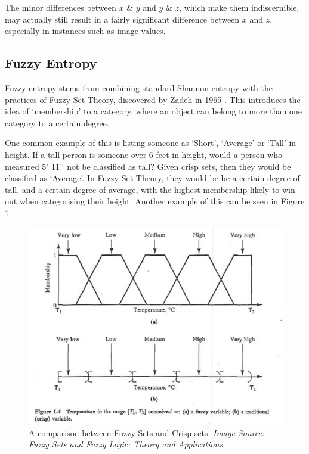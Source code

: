 The minor differences between $x$ \& $y$ and $y$ \& $z$, which make them indiscernible, may actually still result in a fairly significant difference between $x$ and $z$, especially in instances such as image values.

\subsection{Fuzzy Entropy}
\label{ssec:fuzzy-entropy}

Fuzzy entropy stems from combining standard Shannon entropy with the practices of Fuzzy Set Theory, discovered by Zadeh in 1965 \cite{Zadeh_1965}. This introduces the idea of `membership' to a category, where an object can belong to more than one category to a certain degree.

One common example of this is listing someone as `Short', `Average' or `Tall' in height. If a tall person is someone over 6 feet in height, would a person who measured 5' 11'` not be classified as tall? Given crisp sets, then they would be classified as `Average'. In Fuzzy Set Theory, they would be be a certain degree of tall, and a certain degree of average, with the highest membership likely to win out when categorising their height. Another example of this can be seen in Figure \ref{fig:fuzzy-sets}

\begin{figure}[H]
  \center
  \includegraphics[scale=0.6]{Chapter1/lit-review-img/fuzzy-sets.png}
  \caption{A comparison between Fuzzy Sets and Crisp sets. \textit{Image Source: Fuzzy Sets and Fuzzy Logic: Theory and Applications \cite{GEORGE_J_BO_2008}}}
  \label{fig:fuzzy-sets}
\end{figure}

